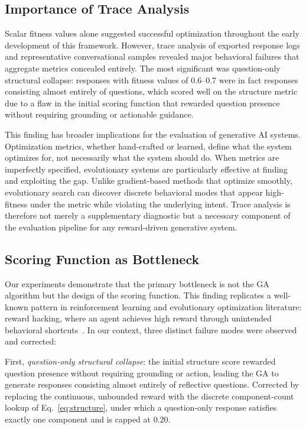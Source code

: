 \documentclass[mathematics,article,xetex,moreauthors]{Definitions/mdpi}
\begin{document}
\subsection{Importance of Trace Analysis}

Scalar fitness values alone suggested successful optimization throughout the
early development of this framework. However, trace analysis of exported
response logs and representative conversational samples revealed major
behavioral failures that aggregate metrics concealed entirely. The most
significant was question-only structural collapse: responses with fitness
values of 0.6--0.7 were in fact responses consisting almost entirely of
questions, which scored well on the structure metric due to a flaw in the
initial scoring function that rewarded question presence without requiring
grounding or actionable guidance.

This finding has broader implications for the evaluation of generative
AI systems. Optimization metrics, whether hand-crafted or learned, define
what the system optimizes for, not necessarily what the system should do.
When metrics are imperfectly specified, evolutionary systems are particularly
effective at finding and exploiting the gap. Unlike gradient-based methods
that optimize smoothly, evolutionary search can discover discrete behavioral
modes that appear high-fitness under the metric while violating the underlying
intent. Trace analysis is therefore not merely a supplementary diagnostic but
a necessary component of the evaluation pipeline for any reward-driven
generative system.

\subsection{Scoring Function as Bottleneck}
\label{sec:scoring-bottleneck}

Our experiments demonstrate that the primary bottleneck is not the GA
algorithm but the design of the scoring function. This finding replicates a
well-known pattern in reinforcement learning and evolutionary optimization
literature: reward hacking, where an agent achieves high reward through
unintended behavioral shortcuts~\cite{back1997evolutionary}. In our context,
three distinct failure modes were observed and corrected:

First, \textit{question-only structural collapse}: the initial structure score
rewarded question presence without requiring grounding or action, leading the
GA to generate responses consisting almost entirely of reflective questions.
Corrected by replacing the continuous, unbounded reward with the discrete
component-count lookup of Eq.~\eqref{eq:structure}, under which a
question-only response satisfies exactly one component and is capped at
$0.20$.
\end{document}
